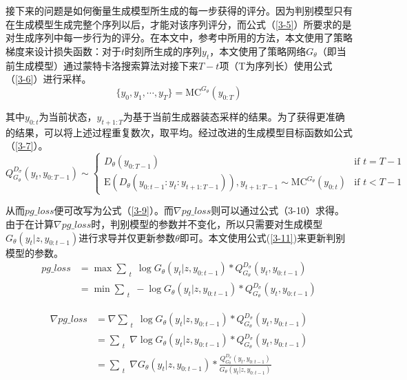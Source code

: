 接下来的问题是如何衡量生成模型所生成的每一步获得的评分。因为判别模型只有在生成模型生成完整个序列以后，才能对该序列评分，而公式（\ref{3-5}）所要求的是对生成序列中每一步行为的评分。在本文中，参考中所用的方法，本文使用了策略梯度来设计损失函数：对于$t$时刻所生成的序列$y_t$，本文使用了策略网络$G_\theta$（即当前生成模型）通过蒙特卡洛搜索算法对接下来$T-t$项（T为序列长）使用公式（\ref{3-6}）进行采样。
\begin{equation}\label{3-6}
    \{y_0,y_1,\dotsb,y_T\}=\mathrm{MC}^{G_\theta}(y_{0:T})
\end{equation}

其中$y_{0:t}$为当前状态，$y_{t+1:T}$为基于当前生成器装态采样的结果。为了获得更准确的结果，可以将上述过程重复数次，取平均。经过改进的生成模型目标函数如公式（\ref{3-7}）。
\begin{equation}\label{3-7}
Q_{G_\theta}^{D_\sigma}(y_t,y_{0:T-1})\sim 
\begin{cases}
    D_\theta(y_{0:T-1}) & \text{if } t =T-1 \\
    \mathrm{E}(D_\theta(y_{0:t-1}:y_t:y_{t+1:T-1})),y_{t+1:T-1}\sim \mathrm{MC}^{G_\theta}(y_{0:t}) & \text{if }t<T-1
\end{cases}
\end{equation}

从而$pg\_loss$便可改写为公式（\ref{3-9}）。而$\nabla pg\_loss$则可以通过公式（3-10）求得。由于在计算$\nabla pg\_loss$时，判别模型的参数并不变化，所以只需要对生成模型$G_\theta (y_t|z,y_{0:t-1})$进行求导并仅更新参数$\theta$即可。本文使用公式(\ref{3-11})来更新判别模型的参数。
\begin{align}\label{3-9}
    pg\_loss &=\mathop{max}\sum_{\substack{t}}\log G_\theta (y_t|z,y_{0:t-1})*Q_{G_\theta}^{D_\sigma} (y_t,y_{0:t-1})\\
             &=\mathop{min}\sum_{\substack{t}}-\log G_\theta (y_t|z,y_{0:t-1})*Q_{G_\theta}^{D_\sigma} (y_t,y_{0:t-1})
\end{align}

\begin{align}\label{3-10}
    \nabla pg\_loss &= \nabla \sum_{\substack{t}}\log G_\theta (y_t|z,y_{0:t-1})*Q_{G_\theta}^{D_\sigma} (y_t,y_{0:t-1})\\
                    &= \sum_{\substack{t}}\nabla\log G_\theta (y_t|z,y_{0:t-1})*Q_{G_\theta}^{D_\sigma} (y_t,y_{0:t-1})\\
                    &= \sum_{\substack{t}}\nabla G_\theta (y_t|z,y_{0:t-1})*\frac{Q_{G_\theta}^{D_\sigma} (y_t,y_{0:t-1})}{G_\theta (y_t|z,y_{0:t-1})}
\end{align}

